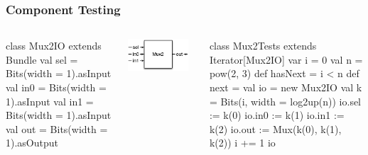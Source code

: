 \documentclass[xcolor=pdflatex,dvipsnames,table]{beamer}
\begin{document}
\begin{frame}[fragile]
\frametitle{Component Testing}


\begin{columns}

{
\begin{scala}
class Mux2IO extends Bundle {
  val sel = Bits(width = 1).asInput
  val in0 = Bits(width = 1).asInput
  val in1 = Bits(width = 1).asInput
  val out = Bits(width = 1).asOutput
}
\end{scala}
}
\begin{center}
\includegraphics[width=0.9\textwidth]{figs/mux2.pdf} 
\end{center}

{
\begin{scala}
class Mux2Tests extends Iterator[Mux2IO] { 
  var i = 0
  val n = pow(2, 3)
  def hasNext = i < n
  def next = { 
    val io  = new Mux2IO
    val k   = Bits(i, width = log2up(n))
    io.sel := k(0)
    io.in0 := k(1)
    io.in1 := k(2)
    io.out := Mux(k(0), k(1), k(2))
    i      += 1
    io
  }
}
\end{scala}
}

\end{columns}

\end{frame}
\end{document}
